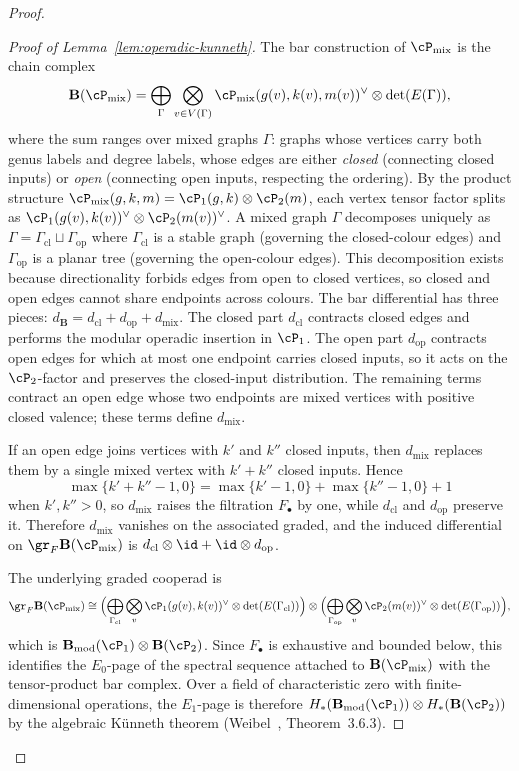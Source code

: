\begin{proof}
\begin{proof}[Proof of Lemma~\textup{\ref{lem:operadic-kunneth}}]
The bar construction of $\cP_{\mathrm{mix}}$ is the chain complex
\[
 \mathbf{B}(\cP_{\mathrm{mix}})
 = \bigoplus_{\Gamma}
 \bigotimes_{v \in V(\Gamma)}
 \cP_{\mathrm{mix}}(g(v), k(v), m(v))^{\vee}
 \otimes \det(E(\Gamma)),
\]
where the sum ranges over mixed graphs $\Gamma$: graphs whose
vertices carry both genus labels and degree labels, whose edges
are either \emph{closed} (connecting closed inputs) or \emph{open}
(connecting open inputs, respecting the ordering).
By the product structure
$\cP_{\mathrm{mix}}(g,k,m) = \cP_1(g,k) \otimes \cP_2(m)$,
each vertex tensor factor splits as
$\cP_1(g(v), k(v))^{\vee} \otimes \cP_2(m(v))^{\vee}$.
A mixed graph $\Gamma$ decomposes uniquely as
$\Gamma = \Gamma_{\mathrm{cl}} \sqcup \Gamma_{\mathrm{op}}$
where $\Gamma_{\mathrm{cl}}$ is a stable graph (governing the
closed-colour edges) and $\Gamma_{\mathrm{op}}$ is a planar tree
(governing the open-colour edges). This decomposition exists
because directionality forbids edges from open to closed vertices,
so closed and open edges cannot share endpoints across
colours.
The bar differential has three pieces:
$d_{\mathbf{B}} = d_{\mathrm{cl}} + d_{\mathrm{op}} + d_{\mathrm{mix}}$.
The closed part $d_{\mathrm{cl}}$ contracts closed edges and
performs the modular operadic insertion in $\cP_1$.
The open part $d_{\mathrm{op}}$ contracts open edges for which at
most one endpoint carries closed inputs, so it acts on the
$\cP_2$-factor and preserves the closed-input distribution.
The remaining terms contract an open edge whose two endpoints are
mixed vertices with positive closed valence; these terms define
$d_{\mathrm{mix}}$.

If an open edge joins vertices with $k'$ and $k''$ closed inputs,
then $d_{\mathrm{mix}}$ replaces them by a single mixed vertex with
$k' + k''$ closed inputs. Hence
\[
 \max\{k' + k'' - 1, 0\}
 =
 \max\{k'-1, 0\} + \max\{k''-1, 0\} + 1
\]
when $k', k'' > 0$, so $d_{\mathrm{mix}}$ raises the filtration
$F_\bullet$ by one, while $d_{\mathrm{cl}}$ and $d_{\mathrm{op}}$
preserve it. Therefore $d_{\mathrm{mix}}$ vanishes on the
associated graded, and the induced differential on
$\gr_F \mathbf{B}(\cP_{\mathrm{mix}})$ is
$d_{\mathrm{cl}} \otimes \id + \id \otimes d_{\mathrm{op}}$.

The underlying graded cooperad is
\[
 \gr_F \mathbf{B}(\cP_{\mathrm{mix}})
 \cong
 \Bigl(\bigoplus_{\Gamma_{\mathrm{cl}}}
 \bigotimes_v \cP_1(g(v), k(v))^{\vee}
 \otimes \det(E(\Gamma_{\mathrm{cl}}))\Bigr)
 \otimes
 \Bigl(\bigoplus_{\Gamma_{\mathrm{op}}}
 \bigotimes_v \cP_2(m(v))^{\vee}
 \otimes \det(E(\Gamma_{\mathrm{op}}))\Bigr),
\]
which is $\mathbf{B}_{\mathrm{mod}}(\cP_1)
\otimes \mathbf{B}(\cP_2)$.
Since $F_\bullet$ is exhaustive and bounded below, this identifies
the $E_0$-page of the spectral sequence attached to
$\mathbf{B}(\cP_{\mathrm{mix}})$ with the tensor-product bar
complex. Over a field of characteristic zero with finite-dimensional
operations, the $E_1$-page is therefore
$H_\ast(\mathbf{B}_{\mathrm{mod}}(\cP_1))
\otimes H_\ast(\mathbf{B}(\cP_2))$
by the algebraic K\"unneth theorem
\textup{(}Weibel~\cite{Wei94}, Theorem~3.6.3\textup{)}.
\end{proof}


\end{proof}
